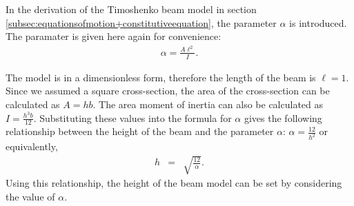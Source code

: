 \begin{figure}[h!]
{{\begin{minipage}[b]{0.8\linewidth}
\begin{center}
					\end{center}
				\end{minipage}
			}
		}
	\end{figure}\label{fig:compare:1D+2D}

	In the derivation of the Timoshenko beam model in section \ref{subsec:equationsofmotion+constitutiveequation}, the parameter $\alpha$ is 
	introduced. The paramater is given here again for convenience:
	\begin{eqnarray*}
		\alpha = \frac{A\ell^2}{I}.
	\end{eqnarray*}

	The model is in a dimensionless form, therefore the length of the beam is $\ell = 1$. Since we assumed a square cross-section, the area of the cross-section can be calculated as $\displaystyle A = hb$. The area moment of inertia can also be calculated as $\displaystyle I = \frac{h^3b}{12}$. Substituting these values into the formula for $\alpha$ gives the following relationship between the height of the beam and the parameter $\alpha$: $\displaystyle \alpha = \frac{12}{h^2}$
	or equivalently,
	\begin{eqnarray}
		h & = & \sqrt{\frac{12}{\alpha}}. \label{eq:h-alpha-relationship}
	\end{eqnarray}
	Using this relationship, the height of the beam model can be set by considering the value of $\alpha$.


